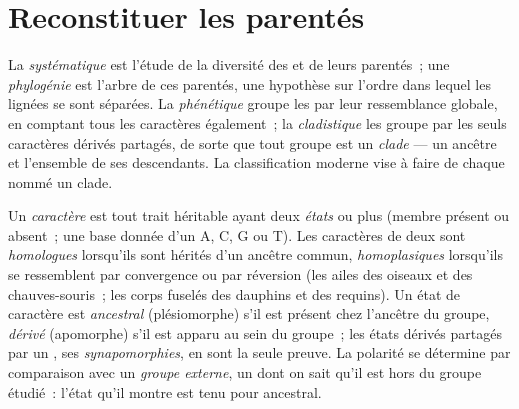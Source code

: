 \section{Reconstituer les parentés}

\begin{definition}\label{def:b1:classifying-biodiversity:systematics}
La \emph{systématique} est l'étude de la diversité des  et de
leurs parentés~; une \emph{phylogénie} est l'arbre de ces parentés, une
hypothèse sur l'ordre dans lequel les lignées se sont séparées. La
\emph{phénétique} groupe les  par leur ressemblance globale,
en comptant tous les caractères également~; la \emph{cladistique} les
groupe par les seuls caractères dérivés partagés, de sorte que tout
groupe est un \emph{clade} --- un ancêtre et l'ensemble de ses
descendants. La classification moderne vise à faire de chaque 
nommé un clade.
\end{definition}

\begin{definition}\label{def:b1:classifying-biodiversity:characters}
Un \emph{caractère} est tout trait héritable ayant deux \emph{états} ou
plus (membre présent ou absent~; une base donnée d'un  A, C, G ou
T). Les caractères de deux  sont \emph{homologues} lorsqu'ils
sont hérités d'un ancêtre commun, \emph{homoplasiques} lorsqu'ils se
ressemblent par convergence ou par réversion (les ailes des oiseaux et
des chauves-souris~; les corps fuselés des dauphins et des requins). Un
état de caractère est \emph{ancestral} (plésiomorphe) s'il est présent
chez l'ancêtre du groupe, \emph{dérivé} (apomorphe) s'il est apparu au
sein du groupe~; les états dérivés partagés par un , ses
\emph{synapomorphies}, en sont la seule preuve. La polarité se
détermine par comparaison avec un \emph{groupe externe}, un  dont
on sait qu'il est hors du groupe étudié~: l'état qu'il montre est tenu
pour ancestral.
\end{definition}

